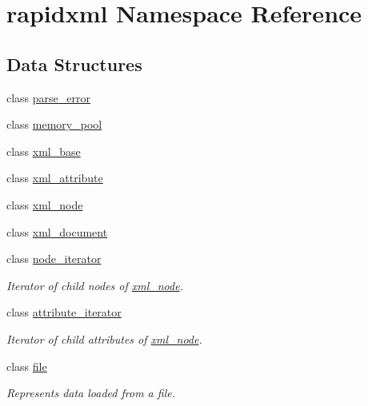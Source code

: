 \hypertarget{namespacerapidxml}{
\section{rapidxml Namespace Reference}
\label{d7/d8a/namespacerapidxml}
}
\subsection*{Data Structures}
\begin{DoxyCompactItemize}
\item 
class \hyperlink{classrapidxml_1_1parse__error}{parse\_\-error}
\item 
class \hyperlink{classrapidxml_1_1memory__pool}{memory\_\-pool}
\item 
class \hyperlink{classrapidxml_1_1xml__base}{xml\_\-base}
\item 
class \hyperlink{classrapidxml_1_1xml__attribute}{xml\_\-attribute}
\item 
class \hyperlink{classrapidxml_1_1xml__node}{xml\_\-node}
\item 
class \hyperlink{classrapidxml_1_1xml__document}{xml\_\-document}
\item 
class \hyperlink{classrapidxml_1_1node__iterator}{node\_\-iterator}
\begin{DoxyCompactList}\small\item\em Iterator of child nodes of \hyperlink{classrapidxml_1_1xml__node}{xml\_\-node}. \item\end{DoxyCompactList}\item 
class \hyperlink{classrapidxml_1_1attribute__iterator}{attribute\_\-iterator}
\begin{DoxyCompactList}\small\item\em Iterator of child attributes of \hyperlink{classrapidxml_1_1xml__node}{xml\_\-node}. \item\end{DoxyCompactList}\item 
class \hyperlink{classrapidxml_1_1file}{file}
\begin{DoxyCompactList}\small\item\em Represents data loaded from a file. \item\end{DoxyCompactList}\end{DoxyCompactItemize}
